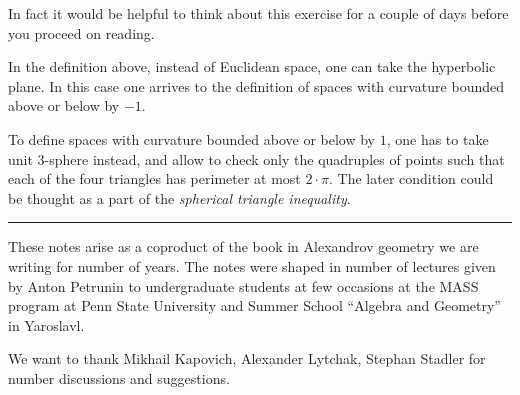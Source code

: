 In fact it would be helpful to think about this exercise for a couple of days before you proceed on reading.

In the definition above, 
instead of Euclidean space, 
one can take the hyperbolic plane.
In this case
one arrives to the definition of spaces with curvature bounded above or below by $-1$.

To define spaces with curvature bounded above or below by $1$,
one has to take unit 3-sphere instead,
and allow to check only the quadruples of points such that each of the four triangles has perimeter at most $2\cdot\pi$.
The later condition could be thought as a part of the \emph{spherical triangle inequality}.

\medskip
\noindent\rule{2cm}{0.4pt}

These notes arise as a coproduct of the book in Alexandrov geometry
we are writing for number of years.
The notes were shaped in number of lectures given by Anton Petrunin 
to undergraduate students 
at few occasions at the
MASS program at Penn State University
and Summer School ``Algebra and Geometry'' in Yaroslavl.

We want to thank 
Mikhail Kapovich, 
Alexander Lytchak,
Stephan Stadler
for number discussions and suggestions.








